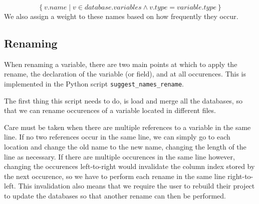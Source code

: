 \begin{equation}
	\left \{ v.name
			\mid v \in database.variables \land v.type = variable.type \right \}
\end{equation}
We also assign a weight to these names based on how frequently they occur.

\subsection{Renaming}

When renaming a variable, there are two main points at which to apply the
rename, the declaration of the variable (or field), and at all occurences.
This is implemented in the Python script \lstinline|suggest_names_rename|.

The first thing this script needs to do, is load and merge all the databases,
so that we can rename occurences of a variable located in different files.

Care must be taken when there are multiple references to a variable in the same
line. If no two references occur in the same line, we can simply go to each
location and change the old name to the new name, changing the length of the
line as necessary. If there are multiple occurences in the same line however,
changing the occurences left-to-right would invalidate the column index stored
by the next occurence, so we have to perform each rename in the same line
right-to-left. This invalidation also means that we require the user to rebuild
their project to update the databases so that another rename can then be
performed.

